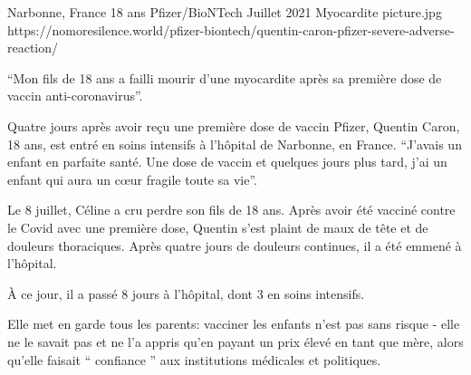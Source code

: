 {Narbonne, France}
{18 ans}
{Pfizer/BioNTech}
{Juillet 2021}
{Myocardite}
{picture.jpg}
{https://nomoresilence.world/pfizer-biontech/quentin-caron-pfizer-severe-adverse-reaction/}
{

“Mon fils de 18 ans a failli mourir d'une myocardite après sa première dose de
vaccin anti-coronavirus”.

Quatre jours après avoir reçu une première dose de vaccin Pfizer, Quentin Caron,
18 ans, est entré en soins intensifs à l'hôpital de Narbonne, en
France. “J'avais un enfant en parfaite santé. Une dose de vaccin et quelques
jours plus tard, j'ai un enfant qui aura un cœur fragile toute sa vie”.

Le 8 juillet, Céline a cru perdre son fils de 18 ans. Après avoir été vacciné
contre le Covid avec une première dose, Quentin s'est plaint de maux de tête et
de douleurs thoraciques. Après quatre jours de douleurs continues, il a été
emmené à l'hôpital.

À ce jour, il a passé 8 jours à l'hôpital, dont 3 en soins intensifs.

Elle met en garde tous les parents: vacciner les enfants n'est pas sans risque -
elle ne le savait pas et ne l'a appris qu'en payant un prix élevé en tant que
mère, alors qu'elle faisait “ confiance ” aux institutions médicales et
politiques.

}
